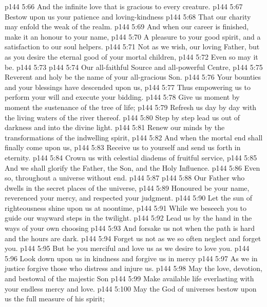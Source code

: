 \vs p144 5:66 \hsetoff And the infinite love that is gracious to every creature.
\vs p144 5:67 Bestow upon us your patience and loving\hyp{}kindness
\vs p144 5:68 \hsetoff That our charity may enfold the weak of the realm.
\vs p144 5:69 And when our career is finished, make it an honour to your name,
\vs p144 5:70 \hsetoff A pleasure to your good spirit, and a satisfaction to our soul helpers.
\vs p144 5:71 Not as we wish, our loving Father, but as you desire the eternal good of your mortal children,
\vs p144 5:72 \hsetoff Even so may it be.
\vs p144 5:73 \separatorshort
\vs p144 5:74 Our all\hyp{}faithful Source and all\hyp{}powerful Centre,
\vs p144 5:75 \hsetoff Reverent and holy be the name of your all\hyp{}gracious Son.
\vs p144 5:76 Your bounties and your blessings have descended upon us,
\vs p144 5:77 \hsetoff Thus empowering us to perform your will and execute your bidding.
\vs p144 5:78 Give us moment by moment the sustenance of the tree of life;
\vs p144 5:79 \hsetoff Refresh us day by day with the living waters of the river thereof.
\vs p144 5:80 Step by step lead us out of darkness and into the divine light.
\vs p144 5:81 \hsetoff Renew our minds by the transformations of the indwelling spirit,
\vs p144 5:82 And when the mortal end shall finally come upon us,
\vs p144 5:83 \hsetoff Receive us to yourself and send us forth in eternity.
\vs p144 5:84 Crown us with celestial diadems of fruitful service,
\vs p144 5:85 \hsetoff And we shall glorify the Father, the Son, and the Holy Influence.
\vs p144 5:86 Even so, throughout a universe without end.
\vs p144 5:87 \separatorshort
\vs p144 5:88 Our Father who dwells in the secret places of the universe,
\vs p144 5:89 \hsetoff Honoured be your name, reverenced your mercy, and respected your judgment.
\vs p144 5:90 Let the sun of righteousness shine upon us at noontime,
\vs p144 5:91 \hsetoff While we beseech you to guide our wayward steps in the twilight.
\vs p144 5:92 Lead us by the hand in the ways of your own choosing
\vs p144 5:93 \hsetoff And forsake us not when the path is hard and the hours are dark.
\vs p144 5:94 Forget us not as we so often neglect and forget you.
\vs p144 5:95 \hsetoff But be you merciful and love us as we desire to love you.
\vs p144 5:96 Look down upon us in kindness and forgive us in mercy
\vs p144 5:97 \hsetoff As we in justice forgive those who distress and injure us.
\vs p144 5:98 May the love, devotion, and bestowal of the majestic Son
\vs p144 5:99 \hsetoff Make available life everlasting with your endless mercy and love.
\vs p144 5:100 May the God of universes bestow upon us the full measure of his spirit;
